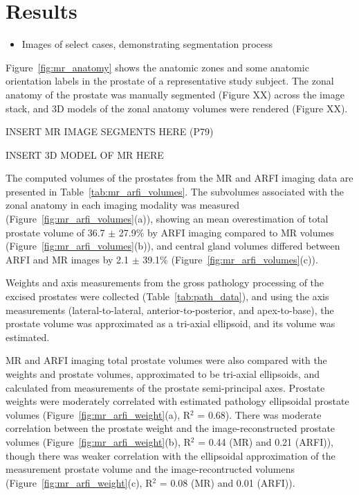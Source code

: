 \section{Results}\label{sect:results}

\begin{itemize}
    \item Images of select cases, demonstrating segmentation process
\end{itemize}

Figure~\ref{fig:mr_anatomy} shows the anatomic zones and some anatomic
orientation labels in the prostate of a representative study subject.  The
zonal anatomy of the prostate was manually segmented (Figure XX) across the
image stack, and 3D models of the zonal anatomy volumes were rendered (Figure
XX).



INSERT MR IMAGE SEGMENTS HERE (P79)

INSERT 3D MODEL OF MR HERE

The computed volumes of the prostates from the MR and ARFI imaging data are
presented in Table~\ref{tab:mr_arfi_volumes}.  The subvolumes associated with
the zonal anatomy in each imaging modality was measured
(Figure~\ref{fig:mr_arfi_volumes}(a)), showing an mean overestimation of total
prostate volume of 36.7 $\pm$ 27.9\% by ARFI imaging compared to MR volumes
(Figure~\ref{fig:mr_arfi_volumes}(b)), and central gland volumes differed
between ARFI and MR images by 2.1 $\pm$ 39.1\%
(Figure~\ref{fig:mr_arfi_volumes}(c)).





Weights and axis measurements from the gross pathology processing of the
excised prostates were collected (Table~\ref{tab:path_data}), and using the
axis measurements (lateral-to-lateral, anterior-to-posterior, and
apex-to-base), the prostate volume was approximated as a tri-axial ellipsoid,
and its volume was estimated.



MR and ARFI imaging total prostate volumes were also compared with the weights
and prostate volumes, approximated to be tri-axial ellipsoids, and calculated
from measurements of the prostate semi-principal axes.  Prostate weights were
moderately correlated with estimated pathology ellipsoidal prostate volumes
(Figure~\ref{fig:mr_arfi_weight}(a), R$^2$ = 0.68).  There was moderate
correlation between the prostate weight and the image-reconstructed prostate
volumes (Figure~\ref{fig:mr_arfi_weight}(b), R$^2$ = 0.44 (MR) and 0.21
(ARFI)), though there was weaker correlation with the ellipsoidal approximation
of the measurement prostate volume and the image-recontructed volumens
(Figure~\ref{fig:mr_arfi_weight}(c), R$^2$ = 0.08 (MR) and 0.01 (ARFI)).  

